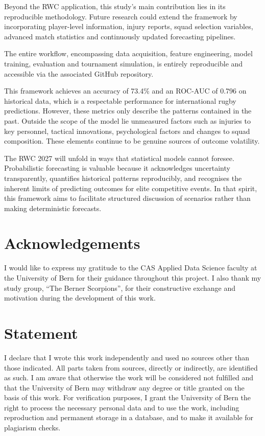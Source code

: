 \documentclass[12pt,a4paper,onecolumn]{article}
\begin{document}
Beyond the RWC application, this study's main contribution lies in its reproducible methodology. Future research could extend the framework by incorporating player-level information, injury reports, squad selection variables, advanced match statistics and continuously updated forecasting pipelines.

The entire workflow, encompassing data acquisition, feature engineering, model training, evaluation and tournament simulation, is entirely reproducible and accessible via the associated GitHub repository.

This framework achieves an accuracy of 73.4\% and an ROC-AUC of 0.796 on historical data, which is a respectable performance for international rugby predictions. However, these metrics only describe the patterns contained in the past. Outside the scope of the model lie unmeasured factors such as injuries to key personnel, tactical innovations, psychological factors and changes to squad composition. These elements continue to be genuine sources of outcome volatility.

The RWC 2027 will unfold in ways that statistical models cannot foresee. Probabilistic forecasting is valuable because it acknowledges uncertainty transparently, quantifies historical patterns reproducibly, and recognises the inherent limits of predicting outcomes for elite competitive events. In that spirit, this framework aims to facilitate structured discussion of scenarios rather than making deterministic forecasts.

\section{Acknowledgements}
I would like to express my gratitude to the CAS Applied Data Science faculty at the University of Bern for their guidance throughout this project. I also thank my study group, ``The Berner Scorpions'', for their constructive exchange and motivation during the development of this work.

\section{Statement}
I declare that I wrote this work independently and used no sources other than those indicated. All parts taken from sources, directly or indirectly, are identified as such. I am aware that otherwise the work will be considered not fulfilled and that the University of Bern may withdraw any degree or title granted on the basis of this work. For verification purposes, I grant the University of Bern the right to process the necessary personal data and to use the work, including reproduction and permanent storage in a database, and to make it available for plagiarism checks.
\end{document}
